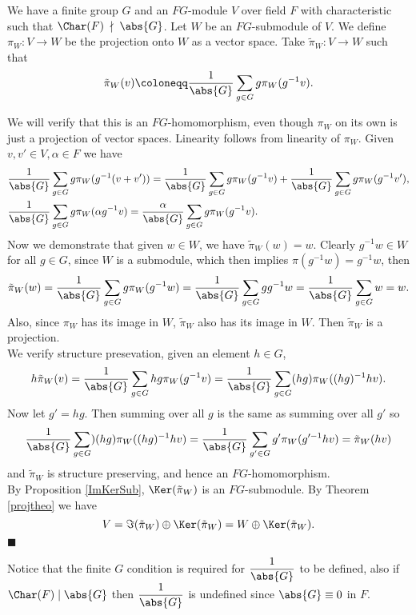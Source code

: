 \documentclass[../Project.tex]{subfiles}
\begin{document}
\begin{proo*}
	We have a finite group $G$ and an $FG$-module $V$ over field $F$ with characteristic such that $\Char(F)\;\nmid\;\abs{G}$. Let $W$ be an $FG$-submodule of $V$. We define $\pi_W : V \to W$ be the projection onto $W$ as a vector space. Take $\tilde{\pi}_W : V \to W$ such that
	$$\tilde{\pi}_W(v) \coloneqq \frac{1}{\abs{G}}\sum_{g \in G}g\pi_W(g^{-1}v).$$

	We will verify that this is an $FG$-homomorphism, even though $\pi_W$ on its own is just a projection of vector spaces. Linearity follows from linearity of $\pi_W$. Given $v,v' \in V, \alpha \in F$ we have
	\begin{align*}
		&\frac{1}{\abs{G}}\sum_{g \in G}g\pi_W(g^{-1}(v + v')) = \frac{1}{\abs{G}}\sum_{g \in G}g\pi_W(g^{-1}v) + \frac{1}{\abs{G}}\sum_{g \in G}g\pi_W(g^{-1}v'),\\
		&\frac{1}{\abs{G}}\sum_{g \in G}g\pi_W(\alpha g^{-1}v) = \frac\alpha{\abs{G}}\sum_{g \in G}g\pi_W(g^{-1}v).
	\end{align*}
	 Now we demonstrate that given $w \in W$, we have $\tilde{\pi}_W(w) = w$. Clearly $g^{-1}w \in W$ for all $g \in G$, since $W$ is a submodule, which then implies $\pi(g^{-1}w) = g^{-1}w$, then
	$$\tilde{\pi}_W(w) = \frac{1}{\abs{G}}\sum_{g \in G}g\pi_W(g^{-1}w) = \frac{1}{\abs{G}}\sum_{g \in G}gg^{-1}w = \frac{1}{\abs{G}}\sum_{g \in G}w = w.$$
	Also, since $\pi_W$ has its image in $W$, $\tilde{\pi}_W$ also has its image in $W$. Then $\tilde{\pi}_W$ is a projection.\\

	We verify structure presevation, given an element $h \in G$,
	$$h\tilde{\pi}_W(v) = \frac{1}{\abs{G}}\sum_{g \in G}hg\pi_W(g^{-1}v) = \frac{1}{\abs{G}}\sum_{g \in G}(hg)\pi_W((hg)^{-1}hv).$$
	Now let $g' = hg$. Then summing over all $g$ is the same as summing over all $g'$ so
	$$\frac{1}{\abs{G}}\sum_{g \in G})(hg)\pi_W((hg)^{-1}hv) = \frac{1}{\abs{G}}\sum_{g' \in G}g'\pi_W(g'^{-1}hv) = \tilde{\pi}_W(hv)$$
	and $\tilde{\pi}_W$ is structure preserving, and hence an $FG$-homomorphism.\\

	By Proposition \ref{ImKerSub}, $\Ker(\tilde{\pi}_W)$ is an $FG$-submodule. By Theorem \ref{projtheo} we have
	$$V = \Im(\tilde{\pi}_W) \oplus \Ker(\tilde{\pi}_W) = W \oplus \Ker(\tilde{\pi}_W).$$
	\hfill $\blacksquare$
	\end{proo*}

		Notice that the finite $G$ condition is required for $\dfrac{1}{\abs{G}}$ to be defined, also if  $\Char(F) \mid \abs{G}$ then $\dfrac{1}{\abs{G}}$ is undefined since $\abs{G} \equiv 0$ in $F$.\\
\end{document}
